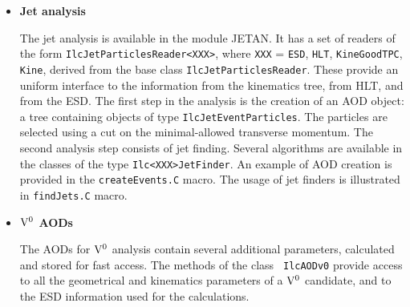\documentclass[12pt,a4paper,twoside]{article}
\begin{document}
{\begin{itemize}
\begin{itemize}
    Particle momentum correlation analysis is based on the event-mixing technique.
    It allows one to extract the signal by dividing the appropriate
    particle spectra coming from the original events by those from the
    mixed events.

    Two analysis objects are currently implemented to perform the mixing:
    the standard one and the one implementing the Stavinsky
    algorithm\cite{CH6Ref:Stavinsky}. Others can easily be added if needed.

    An extensive hierarchy of the function base classes has been implemented
    facilitating the creation of new functions.
    A wide set of the correlation, distribution and monitoring
    functions is already available in the module. See Ref.\cite{CH6Ref:HBTAN}
    for the details. 

    The package contains two implementations of weighting algorithms, used
    for correlation simulations (the first developed by Lednicky
    \cite{CH6Ref:Weights}  and the second due to CRAB \cite{CH6Ref:CRAB}), both
    based on an uniform interface.

  \item[ ] \textbf{Jet analysis}

    The jet analysis\cite{CH6Ref:Loizides} is available in the module JETAN. It has a set of
    readers of the form \texttt{IlcJetParticlesReader<XXX>}, where \texttt{XXX}
    = \texttt{ESD},
    \texttt{HLT}, \texttt{KineGoodTPC}, \texttt{Kine}, derived from the base class
    \texttt{IlcJetParticlesReader}. These
    provide an uniform interface to
    the information from the 
    kinematics tree, from HLT, and from the ESD. The first step in the
    analysis is the creation of an AOD object: a tree containing objects of
    type \texttt{IlcJetEventParticles}. The particles are selected using a
    cut on the minimal-allowed transverse momentum. The second analysis
    step consists of jet finding. Several algorithms are available in the
    classes of the type \texttt{Ilc<XXX>JetFinder}.
    An example of AOD creation is provided in
    the \texttt{createEvents.C} macro. The usage of jet finders is illustrated in
    \texttt{findJets.C} macro.


  \item[ ] \textbf{${\rm V^0}$ AODs}

    The AODs for ${\rm V^0}$ analysis contain several additional parameters,
    calculated and stored for fast access. The methods of the class {\tt
      IlcAODv0} provide access to all the geometrical and kinematics
    parameters of a ${\rm V^0}$ candidate, and to the ESD information used
    for the calculations.


\end{itemize}
\end{itemize}}
\end{document}
